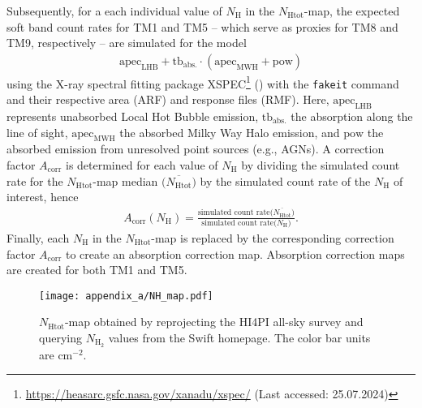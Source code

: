 Subsequently, for a each individual value of \({\textstyle N_{\text{H}}}\) in the \({\textstyle N_{\text{Htot}}}\)-map, the expected soft band count rates for TM1 and TM5 -- which serve as proxies for TM8 and TM9, respectively -- are simulated for the model
\begin{align*}
    \text{apec}_{\text{LHB}} + \text{tb}_\text{abs.}\cdot(\text{apec}_{\text{MWH}} + \text{pow})
\end{align*}
using the X-ray spectral fitting package XSPEC\footnote{\url{https://heasarc.gsfc.nasa.gov/xanadu/xspec/} (Last accessed: 25.07.2024)} (\cite{Arnaud1996}) with the \texttt{fakeit} command and their respective area (ARF) and response files (RMF). Here, \(\text{apec}_{\text{LHB}}\) represents unabsorbed Local Hot Bubble emission, \(\text{tb}_\text{abs.}\) the absorption along the line of sight, \(\text{apec}_{\text{MWH}}\) the absorbed Milky Way Halo emission, and \(\text{pow}\) the absorbed emission from unresolved point sources (e.g., AGNs). A correction factor \(A_{\text{corr}}\) is determined for each value of \(N_\text{H}\) by dividing the simulated count rate for the \({\textstyle N_{\text{Htot}}}\)-map median \({\textstyle \bigl(\overline{N_{\text{Htot}}}\bigr)}\) by the simulated count rate of the \({\textstyle N_{\text{H}}}\) of interest, hence
\begin{align*}
    A_{\text{corr}}(N_\text{H}) = \frac{\text{simulated count rate}\bigl(\overline{N_{\text{Htot}}}\bigr)}{\text{simulated count rate}\bigl(N_\text{H}\bigr)}.
\end{align*}
Finally, each \(\textstyle{N_\text{H}}\) in the \({\textstyle N_\text{Htot}}\)-map is replaced by the corresponding correction factor \(A_\text{corr}\) to create an absorption correction map. Absorption correction maps are created for both TM1 and TM5.
%
\begin{figure}[htbp]
    \centering
    \texttt{[image: appendix\_a/NH\_map.pdf]}
    \caption[\(N_{\text{Htot}}\)-map.]{\(N_{\text{Htot}}\)-map obtained by reprojecting the HI4PI all-sky survey and querying \({\textstyle N_{\text{H}_2}}\) values from the Swift homepage. The color bar units are \(\text{cm}^{-2}\).}
    \label{fig:NH_map}
\end{figure}
%

